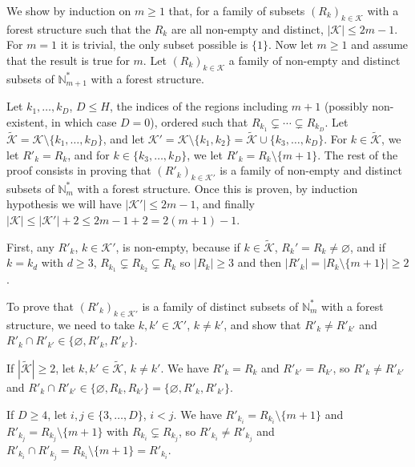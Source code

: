 \documentclass[
  11pt,
  a4paper,
]{article}
\theoremstyle{definition}
\theoremstyle{plain}
\theoremstyle{plain}
\theoremstyle{plain}
\theoremstyle{definition}
\theoremstyle{remark}
\begin{document}
We show by induction on \(m\geq1\) that, for a family of subsets
\((R_k)_{k\in\mathcal{K}}\) with a forest structure such that the
\(R_k\) are all non-empty and distinct, \(|\mathcal{K}|\leq 2m-1\). For
\(m=1\) it is trivial, the only subset possible is \(\{1\}\). Now let
\(m\geq 1\) and assume that the result is true for \(m\). Let
\((R_k)_{k\in\mathcal{K}}\) a family of non-empty and distinct subsets
of \(\mathbb N_{m+1}^*\) with a forest structure.

Let \(k_1, \dotsc, k_D\), \(D\leq H\), the indices of the regions
including \(m+1\) (possibly non-existent, in which case \(D=0\)),
ordered such that \(R_{k_1}\subsetneq\dotsb\subsetneq R_{k_D}\). Let
\(\widetilde{\mathcal{K}}=\mathcal{K}\setminus\{k_1, \dotsc, k_D\}\),
and let
\(\mathcal{K}'=\mathcal{K}\setminus\{k_1, k_2\}=\widetilde{\mathcal{K}}\cup\{k_3, \dotsc, k_D\}\).
For \(k\in \widetilde{\mathcal{K}}\), we let \(R'_k=R_k\), and for
\(k\in\{k_3, \dotsc, k_D\}\), we let \(R'_k=R_k\setminus\{m+1\}\). The
rest of the proof consists in proving that \((R'_k)_{k\in\mathcal{K}'}\)
is a family of non-empty and distinct subsets of \(\mathbb{N}_m^*\) with
a forest structure. Once this is proven, by induction hypothesis we will
have \(|\mathcal{K}'|\leq 2m-1\), and finally
\(|\mathcal{K}|\leq |\mathcal{K}'|+2\leq 2m-1+2=2(m+1)-1\).

First, any \(R'_k\), \(k\in\mathcal{K}'\), is non-empty, because if
\(k\in\widetilde{\mathcal{K}}\), \(R_k'=R_k\neq\varnothing\), and if
\(k=k_d\) with \(d\geq3\), \(R_{k_1}\subsetneq R_{k_2}\subsetneq R_k\)
so \(|R_k|\geq 3\) and then \(|R'_k|=|R_k\setminus\{m+1\}|\geq2\).

To prove that \((R'_k)_{k\in\mathcal{K}'}\) is a family of distinct
subsets of \(\mathbb{N}_m^*\) with a forest structure, we need to take
\(k, k'\in\mathcal{K}'\), \(k\neq k'\), and show that
\(R'_k\neq R'_{k'}\) and
\(R'_k\cap R'_{k'}\in\{\varnothing, R'_k, R'_{k'}\}\).

If \(|\widetilde{\mathcal{K}}|\geq2\), let
\(k, k'\in\widetilde{\mathcal{K}}\), \(k\neq k'\). We have \(R'_k=R_k\)
and \(R'_{k'}=R_{k'}\), so \(R'_k\neq R'_{k'}\) and
\(R'_k\cap R'_{k'}\in\{\varnothing, R_k, R_{k'}\}=\{\varnothing, R'_k, R'_{k'}\}\).

If \(D\geq 4\), let \(i, j\in\{3,\dotsc, D\}\), \(i<j\). We have
\(R'_{k_i}=R_{k_i}\setminus\{m+1\}\) and
\(R'_{k_j}=R_{k_j}\setminus\{m+1\}\) with \(R_{k_i}\subsetneq R_{k_j}\),
so \(R'_{k_i}\neq R'_{k_j}\) and
\(R'_{k_i}\cap R'_{k_j}=R_{k_i}\setminus\{m+1\}=R'_{k_i}\).
\end{document}

